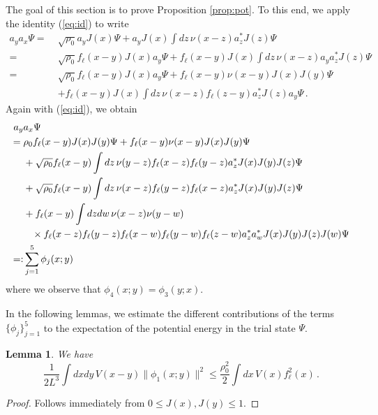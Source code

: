 \documentclass[a4paper,11pt]{article}
\newtheorem{lemma}[theorem]{Lemma}
\numberwithin{equation}{section}
\begin{document}
The goal of this section is to prove Proposition \ref{prop:pot}. To this end, we apply the identity (\ref{eq:id}) to write 
\begin{equation*}
\begin{split} 
a_y a_x \Psi =\; &\sqrt{\rho_0} a_y J(x) \Psi + a_y J(x) \int dz \, \nu (x-z) a_z^* J(z) \Psi \\ = \; &\sqrt{\rho_0} f_\ell(x-y) J(x) a_y \Psi + f_\ell(x-y) J(x) \int dz \, \nu (x-z) a_y a_z^* J(z) \Psi \\ = \; &\sqrt{\rho_0} f_\ell(x-y) J(x) a_y \Psi + f_\ell(x-y)  \nu (x-y)  J(x) J(y) \Psi \\ &+ f_\ell(x-y) J(x) \int dz \, \nu (x-z) f_\ell(z-y) a_z^* J(z) a_y \Psi \,.
\end{split} \end{equation*} 
Again with (\ref{eq:id}), we obtain 
\begin{equation}
\label{eq:axayPsi}
\begin{split}  
a_y &a_x \Psi \\ = \; & \rho_0 f_\ell(x-y) J(x) J(y) \Psi + f_\ell(x-y) \nu (x-y) J(x) J(y) \Psi \\ &+ \sqrt{\rho_0} f_\ell(x-y)  \int dz \, \nu (y-z) f_\ell(x-z) f_\ell(y-z) a_z^* J(x) J(y)  J(z) \Psi \\ &+ \sqrt{\rho_0} f_\ell(x-y) \int dz  \, \nu (x-z) f_\ell(y-z) f_\ell(x-z) a_z^* J(x) J(y) J(z)  \Psi \\ &+ f_\ell(x-y)  \int dz dw \, \nu (x-z) \nu (y-w) \\ & \hspace{.3cm} \times  f_\ell(x-z) f_\ell(y-z) f_\ell(x-w) f_\ell(y-w) f_\ell(z-w) a_z^* a_w^* J(x) J(y) J(z) J(w) \Psi 
\\ =: & \sum_{j=1}^5 \phi_j (x;y) \end{split} \end{equation} 
where we observe that $\phi_4 (x;y) = \phi_3 (y;x)$. 

In the following lemmas, we estimate the different contributions of the terms $\{ \phi_j \}_{j=1}^5$ to the expectation of the potential energy in the trial state $\Psi$. 
\begin{lemma} \label{lm:phi1} 
We have
\[ \frac{1}{2L^3} \int dx dy \, V(x-y) \| \phi_1 (x;y) \|^2 \leq \frac{\rho_0^2}{2} \int dx \, V(x) f_\ell^2 (x)\,.  \] 
\end{lemma} 
\begin{proof} 
Follows immediately from $0 \leq J(x), J(y) \leq 1$. 
\end{proof} 
\end{document}
